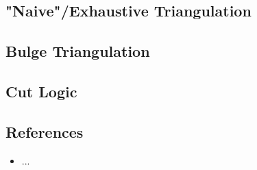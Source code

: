 \documentclass[a4paper,twocolumn]{article}
\begin{document}
\subsection*{"Naive"/Exhaustive Triangulation}

\subsection*{Bulge Triangulation}

\subsection*{Cut Logic}



  

  
\subsection*{References}
\begin{itemize}
\itemsep0em
\item ...
\end{itemize}
\end{document}
